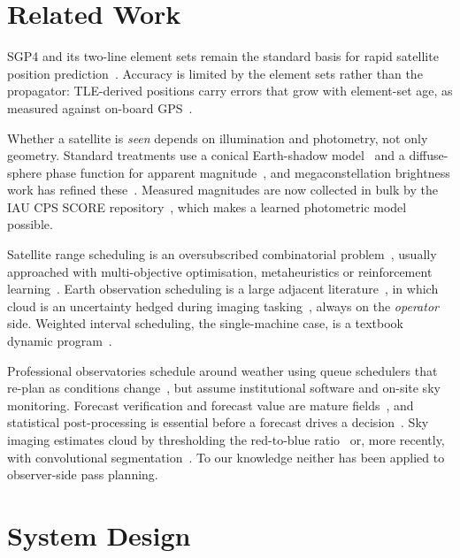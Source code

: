\documentclass[conference]{IEEEtran}
\begin{document}
\section{Related Work}

SGP4 and its two-line element sets remain the standard
basis for rapid satellite position prediction~\cite{vallado2022fundamentals,
acciarini2025sgp4}. Accuracy is limited by the element sets rather than the
propagator: TLE-derived positions carry errors that grow with element-set age,
as measured against on-board GPS~\cite{kovar2022tle}.

Whether a satellite is \emph{seen} depends on
illumination and photometry, not only geometry. Standard treatments use a
conical Earth-shadow model~\cite{vallado2022fundamentals} and a diffuse-sphere
phase function for apparent magnitude~\cite{fankhauser2023brightness}, and
megaconstellation brightness work has refined these~\cite{mallama2021starlink}.
Measured magnitudes are now collected in bulk by the IAU CPS SCORE
repository~\cite{score2026}, which makes a learned photometric model possible.

Satellite range scheduling is an oversubscribed
combinatorial problem~\cite{li2023srsp}, usually approached with multi-objective
optimisation, metaheuristics or reinforcement learning~\cite{ou2023drl}. Earth observation scheduling is a large adjacent
literature~\cite{wang2021agile, eddy2021mis}, in which cloud is an uncertainty
hedged during imaging tasking~\cite{wang2020robust, wang2021robust}, always on
the \emph{operator} side. Weighted interval scheduling, the single-machine
case, is a textbook dynamic program~\cite{cormen2022introduction}.

Professional observatories schedule around
weather using queue schedulers that re-plan as conditions
change~\cite{zhang2024grris, xie2024astrosa}, but assume institutional software
and on-site sky monitoring. Forecast verification and forecast
value are mature fields~\cite{brown2021met}, and statistical
post-processing is essential before a forecast drives a
decision~\cite{vannitsem2021postprocessing}. Sky imaging estimates cloud by
thresholding the red-to-blue ratio~\cite{long2006retrieving} or, more recently,
with convolutional segmentation~\cite{xie2020segcloud}. To our knowledge neither
has been applied to observer-side pass planning.

\section{System Design}
\label{sec:design}
\end{document}
